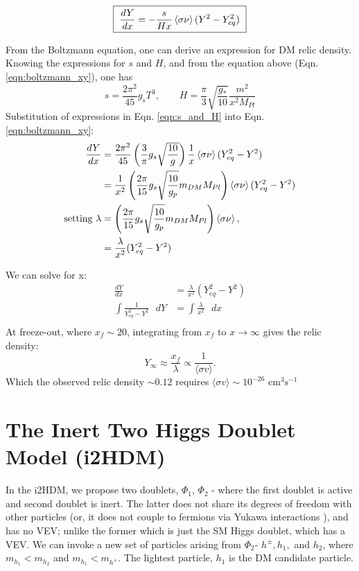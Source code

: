 \documentclass[12pt]{article}
\begin{document}
\begin{equation}
    \boxed{\text{ }\frac{dY}{dx} = -\frac{s}{Hx}\braket{\sigma\nu}(Y^2 - Y^2_{eq})\text{ }}
    \label{eqn:boltzmann_xy}
\end{equation}

From the Boltzmann equation, one can derive an expression for DM relic density. Knowing the expressions for $s$ and $H$, and from the equation above (Eqn. \ref{eqn:boltzmann_xy}), one has
\begin{equation}
    s = \frac{2 \pi^2}{45}{g_s}T^3, \qquad 
    H = \frac{\pi}{3}\sqrt{\frac{g_*}{10}}\frac{m^2}{x^2 M_{Pl}}
    \label{eqn:s_and_H}
\end{equation}
Substitution of expressions in Eqn. \ref{eqn:s_and_H} into Eqn. \ref{eqn:boltzmann_xy}:
\begin{equation}
    \begin{split}
        \frac{dY}{dx} &= \frac{2\pi^2}{45}\left(\frac{3}{\pi}g_s\sqrt{\frac{10}{g}}\right)\frac{1}{x}\braket{\sigma \nu}(Y_{eq}^2 - Y^2) \\
        &= \frac{1}{x^2}\left(\frac{2 \pi}{15}g_s\sqrt{\frac{10}{g_p}}m_{DM}M_{Pl}\right)\braket{\sigma \nu}(Y_{eq}^2 - Y^2) \\
        \text{setting } \lambda &= \left(\frac{2 \pi}{15}g_s\sqrt{\frac{10}{g_p}}m_{DM}M_{Pl}\right)\braket{\sigma \nu}, \\
        &= \frac{\lambda}{x^2}(Y_{eq}^2 - Y^2)
    \end{split}
\end{equation}

We can solve for x:
\begin{equation}
    \begin{split}
        \frac{dY}{dx} &= \frac{\lambda}{x^2} (Y_{eq}^2 - Y^2)
        \\\int \frac{1}{Y_{eq}^2 - Y^2}\text{ } dY &= \int\frac{\lambda}{x^2}\text{ } dx
        \\ 
    \end{split}
\end{equation}
At freeze-out, where $x_f \sim 20$, integrating from $x_f$ to $x\rightarrow \infty$ gives the relic density:
\begin{equation}
    Y_\infty \approx \frac{x_f}{\lambda} \propto \frac{1}{\langle \sigma v \rangle}.
\end{equation}
Which the observed relic density $\sim 0.12$ requires $\langle \sigma v \rangle \sim 10^{-26} \text{ cm}^3 \text{s}^{-1}$
\section{The Inert Two Higgs Doublet Model (i2HDM)}
\label{sec:i2HDM}
In the i2HDM, we propose two doublets, $\Phi_1$, $\Phi_2$ - where the first doublet is active and second doublet is inert. The latter does not share its degrees of freedom with other particles (or, it does not couple to fermions via Yukawa interactions \cite{Belyaev_2022}), and has no VEV; unlike the former which is just the SM Higgs doublet, which has a VEV. We can invoke a new set of particles arising from $\Phi_2$- $h^\pm, h_1,$ and $h_2$, where $m_{h_1} < m_{h_2}$ and $m_{h_1} < m_{h^\pm}$. The lightest particle, $h_1$ is the DM candidate particle.
\end{document}
